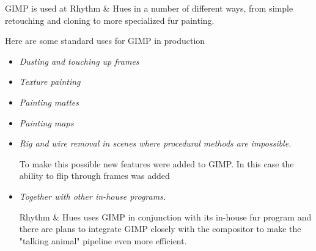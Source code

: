 GIMP is used at Rhythm \& Hues in a number of different ways, from simple
retouching and cloning to more specialized fur painting.

Here are some standard uses for GIMP in production 
\begin{itemize}
\item {\em Dusting and touching up frames }
\item {\em Texture painting  }
\item {\em Painting mattes }
\item {\em Painting maps }
\item {\em Rig and wire removal in scenes where procedural methods are impossible. } 

To make this possible new features were added to GIMP. In this case the ability
to flip through frames was added
\item {\em Together with other in-house programs. } 

Rhythm \& Hues uses GIMP in conjunction with its in-house fur program and there
are plans to integrate GIMP closely with the compositor to make the "talking
animal" pipeline even more efficient.
\end{itemize}
